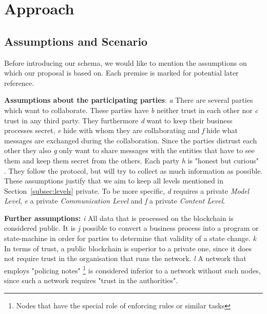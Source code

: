 \documentclass[runningheads]{llncs}
\newcommand{\comment}[1]{}
\newcommand{\comment}[1]{}
\newcommand{\ber}[1]{\textit{#1}}
\newcommand{\refsec}[1]{Section~\ref{#1}}
\begin{document}
\comment{However for private contract execution parity is relying on validators, "account[s] that can allow a private contract’s state [to] change" \cite{parity}. In our understanding this makes parity insufficient for untrusted business execution, since, like private blockchains, it requires trust in one or multiple nodes. 
}




\section{Approach} \label{sec:approach}

\subsection{Assumptions and Scenario} \label{subsec:assumptions}

Before introducing our schema, we would like to mention the assumptions on which our proposal is based on. Each premise is marked for potential later reference. 



\bigbreak
\textbf{Assumptions about the participating parties}: \ber{a} There are several parties which want to collaborate. These parties have \ber{b} neither trust in each other nor \ber{c} trust in any third party. They furthermore \ber{d} want to keep their business processes secret, \ber{e} hide with whom they are collaborating and \ber{f} hide what messages are exchanged during the collaboration. Since the parties distrust each other they also \ber{g} only want to share messages with the entities that have to see them and keep them secret from the others. Each party \ber{h} is "honest but curious" . They follow the protocol, but will try to collect as much information as possible. These assumptions justify that we aim to keep all levels mentioned in \refsec{subsec:levels}  private. To be more specific, \ber{d} requires a private \ber{Model Level}, \ber{e} a private \ber{Communication Level} and \ber{f} a private  \ber{Content Level}.


\bigbreak
\textbf{Further assumptions:}
\ber{i} All data that is processed on the blockchain is considered public. It is \ber{j} possible to convert a business process into a program or state-machine in order for parties to determine that validity of a state change. \ber{k} In terms of trust, a public blockchain is superior to a private one, since it does not require trust in the organisation that runs the network. \ber{l} A network that employs "policing notes" \footnote{Nodes that have the special role of enforcing rules or similar tasks} is considered inferior to a network without such nodes, since such a network requires "trust in the authorities".
\end{document}
